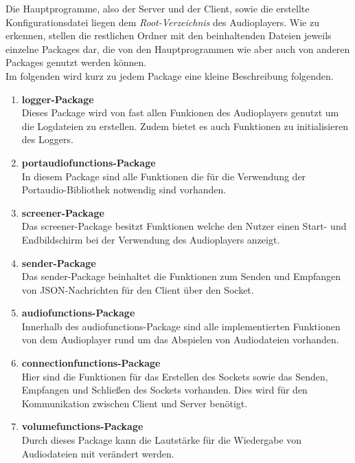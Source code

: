 Die Hauptprogramme, also der Server und der Client, sowie die erstellte
Konfigurationsdatei liegen dem \textit{Root-Verzeichnis} des Audioplayers. Wie
zu erkennen, stellen die restlichen Ordner mit den beinhaltenden Dateien
jeweils einzelne Packages dar, die von den Hauptprogrammen wie aber auch von
anderen Packages genutzt werden können. \\
Im folgenden wird kurz zu jedem Package eine kleine Beschreibung folgenden.
\begin{enumerate}
\item \textbf{logger-Package} \\
Dieses Package wird von fast allen Funkionen des Audioplayers genutzt um die
Logdateien zu erstellen. Zudem bietet es auch Funktionen zu initialisieren des
Loggers.

\item \textbf{portaudiofunctions-Package} \\
In diesem Package sind alle Funktionen die für die Verwendung der
Portaudio-Bibliothek notwendig sind vorhanden. 


\item \textbf{screener-Package} \\
Das screener-Package besitzt Funktionen welche den Nutzer einen Start- und
Endbildschirm bei der Verwendung des Audioplayers anzeigt.


\item \textbf{sender-Package} \\
Das sender-Package beinhaltet die Funktionen zum Senden und Empfangen von
JSON-Nachrichten für den Client über den Socket.


\item \textbf{audiofunctions-Package} \\
Innerhalb des audiofunctions-Package sind alle implementierten Funktionen von
dem Audioplayer rund um das Abspielen von Audiodateien vorhanden.

\item \textbf{connectionfunctions-Package} \\
Hier sind die Funktionen für das Erstellen des Sockets sowie das Senden,
Empfangen und Schließen des Sockets vorhanden. Dies wird für den Kommunikation
zwischen Client und Server benötigt.

\item \textbf{volumefunctions-Package} \\
Durch dieses Package kann die Lautstärke für die Wiedergabe von Audiodateien
mit verändert werden.


\end{enumerate}
